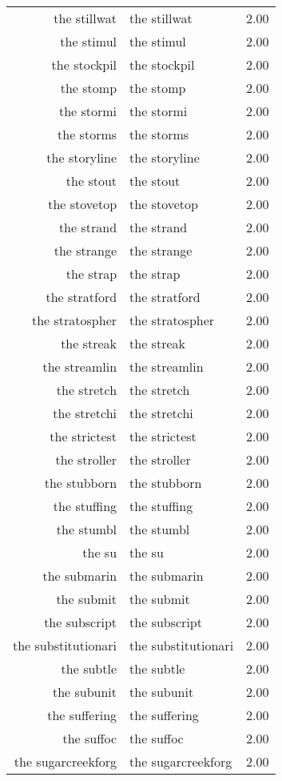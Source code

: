 \begin{table}[ht]
\begin{tabular}{rlr}
  the stillwat & the stillwat & 2.00 \\ 
  the stimul & the stimul & 2.00 \\ 
  the stockpil & the stockpil & 2.00 \\ 
  the stomp & the stomp & 2.00 \\ 
  the stormi & the stormi & 2.00 \\ 
  the storms & the storms & 2.00 \\ 
  the storyline & the storyline & 2.00 \\ 
  the stout & the stout & 2.00 \\ 
  the stovetop & the stovetop & 2.00 \\ 
  the strand & the strand & 2.00 \\ 
  the strange & the strange & 2.00 \\ 
  the strap & the strap & 2.00 \\ 
  the stratford & the stratford & 2.00 \\ 
  the stratospher & the stratospher & 2.00 \\ 
  the streak & the streak & 2.00 \\ 
  the streamlin & the streamlin & 2.00 \\ 
  the stretch & the stretch & 2.00 \\ 
  the stretchi & the stretchi & 2.00 \\ 
  the strictest & the strictest & 2.00 \\ 
  the stroller & the stroller & 2.00 \\ 
  the stubborn & the stubborn & 2.00 \\ 
  the stuffing & the stuffing & 2.00 \\ 
  the stumbl & the stumbl & 2.00 \\ 
  the su & the su & 2.00 \\ 
  the submarin & the submarin & 2.00 \\ 
  the submit & the submit & 2.00 \\ 
  the subscript & the subscript & 2.00 \\ 
  the substitutionari & the substitutionari & 2.00 \\ 
  the subtle & the subtle & 2.00 \\ 
  the subunit & the subunit & 2.00 \\ 
  the suffering & the suffering & 2.00 \\ 
  the suffoc & the suffoc & 2.00 \\ 
  the sugarcreekforg & the sugarcreekforg & 2.00 \\ 

\end{tabular}
\end{table}
